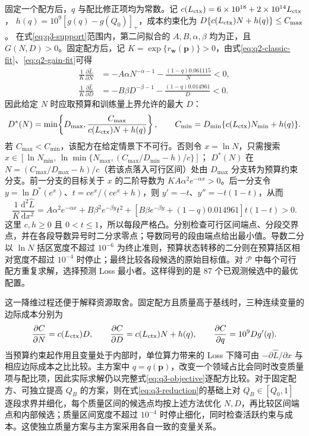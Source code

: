 固定一个配方后，$q$ 与配比修正项均为常数。记
$c(L_{\rm ctx})=6\times10^{18}+2\times10^{14}L_{\rm ctx}$，
$h(q)=10^9[g(q)-g(Q_0)]_+$，成本约束化为
$D\{c(L_{\rm ctx})N+h(q)\}\leq C_{\max}$。
在式\eqref{eq:q3-support}范围内，第二问拟合的 $A,B,\alpha,\beta$ 均为正，且 $G(N,D)>0$。固定配方后，记 $K=\exp\{r_{\boldsymbol w}(\boldsymbol p)\}>0$，由式\eqref{eq:q2-classic-fit}、\eqref{eq:q2-gain-fit}可得
\begin{align}
 \frac{1}{K}\frac{\partial\widehat L}{\partial N}
 &=-A\alpha N^{-\alpha-1}-\frac{(1-q)0.061115}{N}<0,\nonumber\\
 \frac{1}{K}\frac{\partial\widehat L}{\partial D}
 &=-B\beta D^{-\beta-1}-\frac{(1-q)0.014961}{D}<0.
 \label{eq:q3-monotonicity}
\end{align}
因此给定 $N$ 时应取预算和训练量上界允许的最大 $D$：
\begin{equation}
 D^*(N)=\min\!\left\{D_{\max},
 \frac{C_{\max}}{c(L_{\rm ctx})N+h(q)}\right\},\qquad
 C_{\min}=D_{\min}\{c(L_{\rm ctx})N_{\min}+h(q)\}.
 \label{eq:q3-reduction}
\end{equation}
若 $C_{\max}<C_{\min}$，该配方在给定情景下不可行。否则令 $x=\ln N$，只需搜索
$x\in[\ln N_{\min},\,\ln\min\{N_{\max},(C_{\max}/D_{\min}-h)/c\}]$；
$D^*(N)$ 在 $N=(C_{\max}/D_{\max}-h)/c$（若该点落入可行区间）处由 $D_{\max}$ 分支转为预算约束分支。前一分支的目标关于 $x$ 的二阶导数为 $KA\alpha^2e^{-\alpha x}>0$。后一分支令 $y=\ln D^*(e^x)$、$t=ce^x/(ce^x+h)$，则 $y'=-t$、$y''=-t(1-t)$，从而
\begin{equation}
 \frac{1}{K}\frac{\mathrm d^2\widehat L}{\mathrm dx^2}
 =A\alpha^2e^{-\alpha x}
 +B\beta^2e^{-\beta y}t^2
 +\left[B\beta e^{-\beta y}+(1-q)0.014961\right]t(1-t)>0.
 \label{eq:q3-piecewise-convexity}
\end{equation}
这里 $c,h\geq0$ 且 $0<t\leq1$，所以每段严格凸。分别检查可行区间端点、分段交界点，并在各段导数异号时二分求零点；导数同号的段由端点给出最小值。导数二分以 $\ln N$ 括区宽度不超过 $10^{-6}$ 为终止准则，预算状态转移的二分则在预算括区相对宽度不超过 $10^{-4}$ 时停止；最终比较各段候选的原始目标值。对 $\mathcal P$ 中每个可行配方重复求解，选择预测 Loss 最小者。这样得到的是 87 个已观测候选中的最优配置。

这一降维过程还便于解释资源取舍。固定配方且质量高于基线时，三种连续变量的边际成本分别为
\begin{equation}
 \frac{\partial C}{\partial N}=c(L_{\rm ctx})D,\qquad
 \frac{\partial C}{\partial D}=c(L_{\rm ctx})N+h(q),\qquad
 \frac{\partial C}{\partial q}=10^9Dg'(q).
 \label{eq:q3-marginal-cost}
\end{equation}
当预算约束起作用且变量处于内部时，单位算力带来的 Loss 下降可由 $-\partial\widehat L/\partial x$ 与相应边际成本之比比较\cite{wright2022}。主方案中 $q=q(\boldsymbol p)$，改变一个领域占比会同时改变质量项与配比项，因此实际求解仍以完整式\eqref{eq:q3-objective}逐配方比较。对于固定配方、可独立提高 $Q_B$ 的方案，则在式\eqref{eq:q3-reduction}的基础上对 $Q_B\in[Q_0,1]$ 逐段求界并细化，每个质量区间的候选点均按上述方法优化 $N,D$，再比较区间端点和内部候选；质量区间宽度不超过 $10^{-4}$ 时停止细化，同时检查活跃约束与成本。这使独立质量方案与主方案采用各自一致的变量关系。

